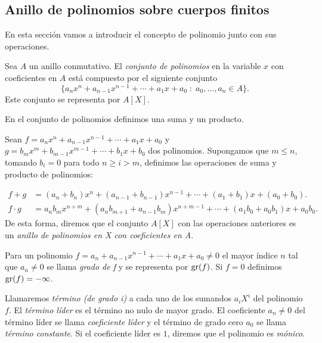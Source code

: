 
\subsection{Anillo de polinomios sobre cuerpos finitos}

En esta sección vamos a introducir el concepto de polinomio junto con sus operaciones.

\begin{definition}
    Sea $A$ un anillo conmutativo. El \emph{conjunto de polinomios} en la variable $x$ con coeficientes en $A$ está compuesto por el siguiente conjunto
    $$\{ a_n x^n  + a_{n-1} x^{n-1} + \cdots + a_1 x + a_0 \; : \; a_0, ..., a_n \in A \}.$$
    Este conjunto se representa por $A[X]$.
\end{definition}

En el conjunto de polinomios definimos una suma y un producto. 

Sean $f = a_n x^n + a_{n-1} x^{n-1} + \cdots + a_1 x + a_0$ y $g = b_m x^m + b_{m-1} x^{m-1} + \cdots + b_1 x + b_0$ dos polinomios. Supongamos que $m \leq n$, tomando $b_i = 0$ para todo $n \geq i > m$, definimos las operaciones de suma y producto de polinomios:

\begin{align*}
    f + g       &= (a_n + b_n)x^n + (a_{n-1} + b_{n-1})x^{n-1} + \cdots + (a_1 + b_1)x + (a_0 + b_0).\\
    f \cdot g   &= a_n b_m x^{n+m} + (a_n b_{m+1} + a_{n-1} b_m) x^{n+m-1} + \cdots + (a_1 b_0 + a_0 b_1)x + a_0 b_0.
\end{align*} 
De esta forma, diremos que el conjunto $A[X]$ con las operaciones anteriores es un \emph{anillo de polinomios en X con coeficientes en A}.

\begin{definition}
    Para un polinomio $f = a_n + a_{n-1} x^{n-1} + \cdots + a_1 x + a_0 \neq 0$ el mayor índice $n$ tal que $a_n \neq 0$ se llama \emph{grado de f} y se representa por $\operatorname{gr}(f)$. Si $f = 0$ definimos $\operatorname{gr}(f) = - \infty$.

    Llamaremos \emph{término (de grado i)} a cada uno de los sumandos $a_i X^i$ del polinomio $f$. El \emph{término líder} es el término no nulo de mayor grado. El coeficiente $a_n \neq 0$ del término líder se llama \emph{coeficiente líder} y el término de grado cero $a_0$ se llama \emph{término constante}. Si el coeficiente líder es $1$, diremos que el polinomio es \emph{mónico}.
\end{definition}

